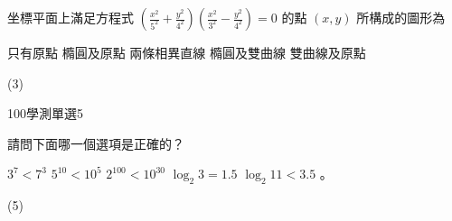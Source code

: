 \begin{QUESTIONS}
\begin{QUESTION}
\begin{ExamAnsRateInfo}{30}{51}{20}{19}
        \end{ExamAnsRateInfo}
        \begin{QBODY}
            坐標平面上滿足方程式 $(\frac{x^2}{5^2} + \frac{y^2}{4^2})(\frac{x^2}{3^2} - \frac{y^2}{4^2})=0$ 的點 $(x,y)$ 所構成的圖形為 \quad 
			\begin{QOPS} 
                \QOP 只有原點 
				\QOP 橢圓及原點 
				\QOP 兩條相異直線 
				\QOP 橢圓及雙曲線 
				\QOP 雙曲線及原點
			\end{QOPS}
        \end{QBODY}
        \begin{QFROMS}
        \end{QFROMS}
        \begin{QTAGS}\end{QTAGS}
        \begin{QANS}
            (3)
        \end{QANS}
        \begin{QSOLLIST}
        \end{QSOLLIST}
        \begin{QEMPTYSPACE}
        \end{QEMPTYSPACE}
    \end{QUESTION}
    \begin{QUESTION}
        \begin{ExamInfo}{100}{學測}{單選}{5}
        \end{ExamInfo}
        \begin{ExamAnsRateInfo}{67}{94}{77}{30}
        \end{ExamAnsRateInfo}
        \begin{QBODY}
            請問下面哪一個選項是正確的？ 
		\begin{QOPS} 
			\QOP $3^7 < 7^3$ 
			\QOP $5^{10} < 10^{5}$ 
			\QOP $2^{100} < 10^{30}$ 
			\QOP $\log_2{3} = 1.5$ 
			\QOP $\log_2{11} < 3.5$ 。
		\end{QOPS}
        \end{QBODY}
        \begin{QFROMS}
        \end{QFROMS}
        \begin{QTAGS}\end{QTAGS}
        \begin{QANS}
            (5)
        \end{QANS}
        \begin{QSOLLIST}

\end{QSOLLIST}
\end{QUESTION}
\end{QUESTIONS}
